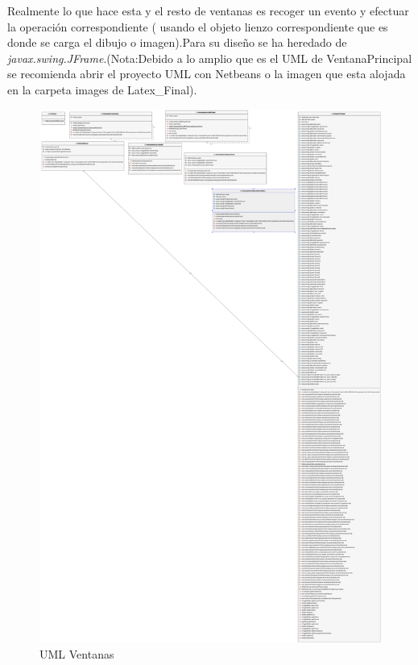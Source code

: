 Realmente lo que hace esta y el resto de ventanas es recoger un evento y efectuar la operación correspondiente ( usando el objeto lienzo correspondiente que es donde se carga el dibujo o imagen).Para su diseño se ha heredado de \emph{javax.swing.JFrame}.(Nota:Debido a lo amplio que es el UML de VentanaPrincipal se recomienda abrir el proyecto UML con Netbeans o la imagen que esta alojada en la carpeta images de Latex\_Final).
\begin{figure}[H]
  \centering
    \includegraphics[scale=0.10]{images/Ventanas}
  \caption{UML Ventanas}
  \label{UML Ventanas}
\end{figure}



